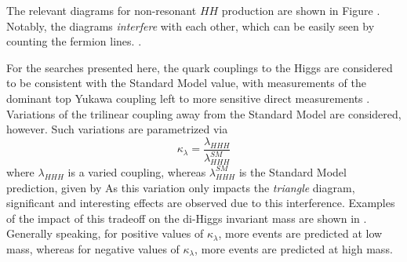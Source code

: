 The relevant diagrams for non-resonant $HH$ production are shown in Figure .
Notably, the diagrams \emph{interfere} with each other, which can be easily seen by counting the fermion lines.
.

For the searches presented here, the quark couplings to the Higgs are considered to be consistent with the Standard 
Model value, with measurements of the dominant top Yukawa coupling left to more sensitive direct measurements . Variations of the trilinear coupling away from the Standard 
Model are considered, however. Such variations are parametrized via 
\begin{equation}
\kappa_{\lambda} = \frac{\lambda_{HHH}}{\lambda_{HHH}^{SM}}
\end{equation}
where $\lambda_{HHH}$ is a varied coupling, whereas $\lambda_{HHH}^{SM}$ is the Standard Model prediction, given by
As this variation only impacts the \emph{triangle} diagram, significant and interesting effects are observed due to this interference. Examples of the impact of this tradeoff on the di-Higgs invariant mass are shown in . Generally speaking, for positive values of $\kappa_{\lambda}$, more events are predicted at low mass, whereas for negative values of $\kappa_{\lambda}$, more events are predicted at high mass.

